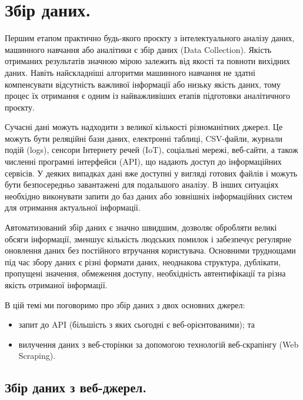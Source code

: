 \chapter{Збір даних.}

Першим етапом практично будь-якого проєкту з інтелектуального аналізу даних, машинного навчання 
або аналітики є збір даних (Data Collection). Якість отриманих результатів значною мірою залежить 
від якості та повноти вихідних даних. Навіть найскладніші алгоритми машинного навчання не здатні 
компенсувати відсутність важливої інформації або низьку якість даних, тому процес їх отримання є 
одним із найважливіших етапів підготовки аналітичного проєкту.

Сучасні дані можуть надходити з великої кількості різноманітних джерел. Це можуть бути 
реляційні бази даних, електронні таблиці, CSV-файли, журнали подій (logs), 
сенсори Інтернету речей (IoT), соціальні мережі, веб-сайти, а також численні 
програмні інтерфейси (API), що надають доступ до інформаційних сервісів. У 
деяких випадках дані вже доступні у вигляді готових файлів і можуть бути 
безпосередньо завантажені для подальшого аналізу. В інших ситуаціях 
необхідно виконувати запити до баз даних або зовнішніх інформаційних 
систем для отримання актуальної інформації. 

Автоматизований збір даних є значно швидшим, дозволяє обробляти великі обсяги інформації, 
зменшує кількість людських помилок і забезпечує регулярне оновлення даних без постійного 
втручання користувача. Основними труднощами під час збору даних є різні формати даних, 
неоднакова структура, дублікати, пропущені значення, обмеження доступу, необхідність 
автентифікації та різна якість отриманої інформації.

В цій темі ми поговоримо про збір даних з двох основних джерел:

\begin{itemize}
\item запит до API (більшість з яких сьогодні є веб-орієнтованими); та

\item вилучення даних з веб-сторінки за допомогою технологій веб-скрапінгу (Web Scraping).
\end{itemize}



\section{Збір даних з веб-джерел.}

